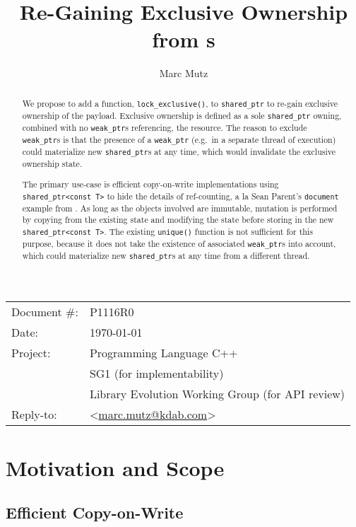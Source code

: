 \documentclass[11pt]{article}
\date{}
\title{Re-Gaining Exclusive Ownership from \sptr{}s}
\makeatletter
\newcommand{\emailaddress}{marc.mutz@kdab.com}
\newcommand{\email}{\href{mailto:\emailaddress}{\emailaddress}}
\newcommand{\lockx}{\texttt{lock\_exclusive()}}
\newcommand{\wptr}{\texttt{weak\_ptr}}
\newcommand{\sptr}{\texttt{shared\_ptr}}
\newcommand{\sptrcT}{\texttt{\sptr<const T>}}
\makeatother
\begin{document}
\maketitle\vspace{-2cm}

\begin{tabular}{ll}
  Document \#:&P1116R0\\
  Date:       &\today\\
  Project:    &Programming Language C++\\
              &SG1 (for implementability)\\
              &Library Evolution Working Group (for API review)\\
  Reply-to:   &\author{Marc Mutz} \textless\email\textgreater
\end{tabular}
\vspace{1cm}
\begin{abstract}
  We propose to add a function, \lockx, to \sptr{} to re-gain
  exclusive ownership of the payload. Exclusive ownership is defined
  as a sole \sptr{} owning, combined with no \wptr{}s referencing, the
  resource. The reason to exclude \wptr{}s is that the presence of a
  \wptr{} (e.g.\ in a separate thread of execution) could materialize
  new \sptr{}s at any time, which would invalidate the exclusive
  ownership state.

  The primary use-case is efficient copy-on-write implementations
  using \sptrcT{} to hide the details of ref-counting, a la Sean
  Parent's \texttt{document} example from \cite{Seasoning}. As long as
  the objects involved are immutable, mutation is performed by copying
  from the existing state and modifying the state before storing in
  the new \sptrcT{}. The existing \texttt{unique()} function is not
  sufficient for this purpose, because it does not take the existence
  of associated \wptr{}s into account, which could materialize new
  \sptr{}s at any time from a different thread.
\end{abstract}


\tableofcontents

\section{Motivation and Scope}

\subsection{Efficient Copy-on-Write}
\end{document}
